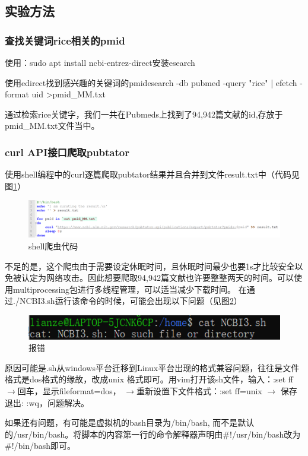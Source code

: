 \documentclass[12pt]{article}
\begin{document}
	\subsection{实验方法}
	\subsubsection{查找关键词rice相关的pmid}
	使用：sudo apt install ncbi-entrez-direct安装esearch\par
	使用edirect找到感兴趣的关键词的pmidesearch -db pubmed -query "rice" | efetch -format uid >pmid\_MM.txt\par
	通过检索rice关键字，我们一共在Pubmeds上找到了94,942篇文献的id,存放于pmid\_MM.txt文件当中。
	\subsubsection{curl API接口爬取pubtator}
	使用shell编程中的curl逐篇爬取pubtator结果并且合并到文件result.txt中（代码见图\ref{mmmm}）\par
\begin{figure}[H]
  \raggedleft
  \includegraphics[scale=0.35]{./picture/curl.png} %
  \caption{shell爬虫代码} %
  \label{mmmm} %
\end{figure}
	不足的是，这个爬虫由于需要设定休眠时间，且休眠时间最少也要1s才比较安全以免被认定为网络攻击。因此想要爬取94,942篇文献也许要整整两天的时间。可以使用multiprocessing包进行多线程管理，可以适当减少下载时间。
	在通过./NCBI3.sh运行该命令的时候，可能会出现以下问题（见图\ref{xxx}）\par
	\begin{figure}[H]
  \centering
  \includegraphics[scale=1.0]{./picture/question1.png} %
  \caption{报错} %
  \label{xxx} %
\end{figure}	

原因可能是.sh从windows平台迁移到Linux平台出现的格式兼容问题，往往是文件格式是dos格式的缘故，改成unix 格式即可。用vim打开该sh文件，输入：:set ff $\rightarrow$回车，显示fileformat=dos， $\rightarrow$重新设置下文件格式：:set ff=unix $\rightarrow$ 保存退出: :wq，问题解决。\par
如果还有问题，有可能是虚拟机的bash目录为/bin/bash, 而不是默认的/usr/bin/bash。将脚本的内容第一行的命令解释器声明由\#!/usr/bin/bash改为\#!/bin/bash即可。\par
\end{document}
